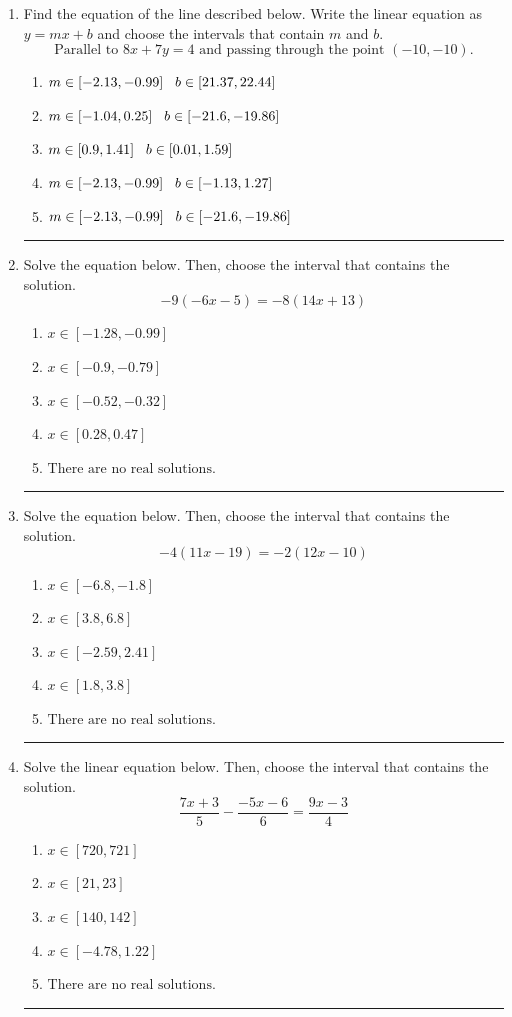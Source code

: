\documentclass[14pt]{extbook}
\newcommand{\litem}[1]{\item#1\hspace*{-1cm}\rule{\textwidth}{0.4pt}}
\begin{document}
\begin{enumerate}
\litem{
Find the equation of the line described below. Write the linear equation as $ y=mx+b $ and choose the intervals that contain $m$ and $b$.\[ \text{Parallel to } 8 x + 7 y = 4 \text{ and passing through the point } (-10, -10). \]\begin{enumerate}[label=\Alph*.]
\item \( m \in [-2.13, -0.99] \hspace*{3mm} b \in [21.37, 22.44] \)
\item \( m \in [-1.04, 0.25] \hspace*{3mm} b \in [-21.6, -19.86] \)
\item \( m \in [0.9, 1.41] \hspace*{3mm} b \in [0.01, 1.59] \)
\item \( m \in [-2.13, -0.99] \hspace*{3mm} b \in [-1.13, 1.27] \)
\item \( m \in [-2.13, -0.99] \hspace*{3mm} b \in [-21.6, -19.86] \)

\end{enumerate} }
\litem{
Solve the equation below. Then, choose the interval that contains the solution.\[ -9(-6x -5) = -8(14x + 13) \]\begin{enumerate}[label=\Alph*.]
\item \( x \in [-1.28, -0.99] \)
\item \( x \in [-0.9, -0.79] \)
\item \( x \in [-0.52, -0.32] \)
\item \( x \in [0.28, 0.47] \)
\item \( \text{There are no real solutions.} \)

\end{enumerate} }
\litem{
Solve the equation below. Then, choose the interval that contains the solution.\[ -4(11x -19) = -2(12x -10) \]\begin{enumerate}[label=\Alph*.]
\item \( x \in [-6.8, -1.8] \)
\item \( x \in [3.8, 6.8] \)
\item \( x \in [-2.59, 2.41] \)
\item \( x \in [1.8, 3.8] \)
\item \( \text{There are no real solutions.} \)

\end{enumerate} }
\litem{
Solve the linear equation below. Then, choose the interval that contains the solution.\[ \frac{7x + 3}{5} - \frac{-5x -6}{6} = \frac{9x -3}{4} \]\begin{enumerate}[label=\Alph*.]
\item \( x \in [720, 721] \)
\item \( x \in [21, 23] \)
\item \( x \in [140, 142] \)
\item \( x \in [-4.78, 1.22] \)
\item \( \text{There are no real solutions.} \)


\end{enumerate}}
\end{enumerate}
\end{document}
